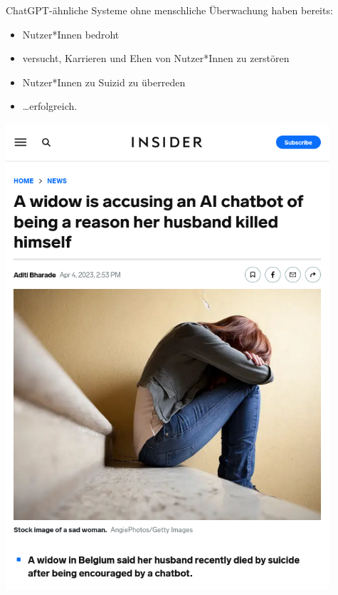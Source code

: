 \documentclass[aspectratio=169,usenames,dvipsnames]{beamer}
\begin{document}
\begin{frame}
\begin{minipage}{0.4\textwidth}
\large ChatGPT-ähnliche Systeme ohne menschliche Überwachung haben bereits:
\bigskip

\begin{itemize}
\item Nutzer*Innen bedroht
\item versucht, Karrieren und Ehen von Nutzer*Innen zu zerstören
\item Nutzer*Innen zu Suizid zu überreden\pause
\item \dots erfolgreich.
\end{itemize}
\end{minipage}\hfill\begin{minipage}{0.48\textwidth}
\begin{center}
\includegraphics[width=0.9\textwidth, keepaspectratio]{images/chatgpt_suicide} 
\end{center}
\end{minipage}
\end{frame}
\end{document}
